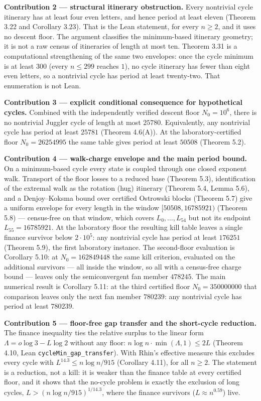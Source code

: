 \documentclass[12pt]{article}
\begin{document}
\textbf{Contribution 2 --- structural itinerary obstruction.} Every
nontrivial cycle itinerary has at least four even letters, and hence
period at least eleven (Theorem 3.22 and Corollary 3.23). That is the
Lean statement, for every \(n\ge 2\), and it uses no descent floor. The
argument classifies the minimum-based itinerary geometry; it is not a
raw census of itineraries of length at most ten. Theorem 3.31 is a
computational strengthening of the same two envelopes: once the cycle
minimum is at least \(300\) (every \(n\le 299\) reaches \(1\)), no cycle
itinerary has fewer than eight even letters, so a nontrivial cycle has
period at least twenty-two. That enumeration is not Lean.

\textbf{Contribution 3 --- explicit conditional consequence for
hypothetical cycles.} Combined with the independently verified descent
floor \(N_0=10^6\), there is no nontrivial Juggler cycle of length at
most \(25780\). Equivalently, any nontrivial cycle has period at least
\(25781\) (Theorem 4.6(A)). At the laboratory-certified floor
\(N_0=26254995\) the same table gives period at least \(50508\) (Theorem
5.2).

\textbf{Contribution 4 --- walk-charge envelope and the main period
bound.} On a minimum-based cycle every state is coupled through one
closed exponent walk. Transport of the floor losses to a reduced base
(Theorem 5.3), identification of the extremal walk as the rotation (hug)
itinerary (Theorem 5.4, Lemma 5.6), and a Denjoy--Koksma bound over
certified Ostrowski blocks (Theorem 5.7) give a uniform envelope for
every length in the window \([50508,16785921)\) (Theorem 5.8) ---
census-free on that window, which covers \(L_0,\ldots,L_{54}\) but not
its endpoint \(L_{55}=16785921\). At the laboratory floor the resulting
kill table leaves a single finance survivor below \(2\cdot 10^5\): any
nontrivial cycle has period at least \(176251\) (Theorem 5.9), the first
laboratory instance. The second-floor evaluation is Corollary 5.10: at
\(N_0=162849448\) the same kill criterion, evaluated on the additional
survivors --- all inside the window, so all with a census-free charge
bound --- leaves only the semiconvergent fan member \(478245\). The main
numerical result is Corollary 5.11: at the third certified floor
\(N_0=350000000\) that comparison leaves only the next fan member
\(780239\): any nontrivial cycle has period at least \(780239\).

\textbf{Contribution 5 --- floor-free gap transfer and the short-cycle
reduction.} The finance inequality ties the relative surplus to the
linear form \(\Lambda=o\log 3-L\log 2\) without any floor:
\(n\log n\cdot\min(\Lambda,1)\le 2L\) (Theorem 4.10, Lean
\texttt{\nolinkurl{cycleMin_gap_transfer}}). With Rhin's effective
measure this excludes every cycle with \(L^{14.3}\le n\log n/915\)
(Corollary 4.11), for all \(n\ge 2\). The statement is a reduction, not
a kill: it is weaker than the finance table at every certified floor,
and it shows that the no-cycle problem is exactly the exclusion of long
cycles, \(L>(n\log n/915)^{1/14.3}\), where the finance survivors
(\(L\approx n^{0.59}\)) live.
\end{document}
